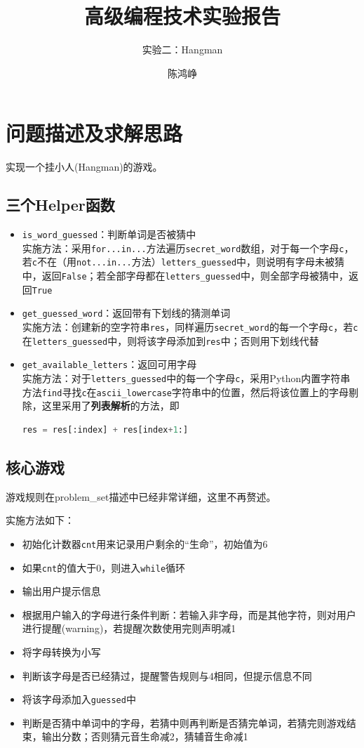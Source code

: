 \documentclass[logo,reportComp]{thesis}
\title{高级编程技术实验报告}
\subtitle{实验二：Hangman}
\author{陈鸿峥}
\begin{document}
\maketitle

\section{问题描述及求解思路}
实现一个挂小人(Hangman)的游戏。

\subsection{三个Helper函数}
\begin{itemize}
	\item \verb'is_word_guessed'：判断单词是否被猜中\\
	实施方法：采用\verb'for...in...'方法遍历\verb'secret_word'数组，对于每一个字母\verb'c'，若\verb'c'不在（用\verb'not...in...'方法）\verb'letters_guessed'中，则说明有字母未被猜中，返回\verb'False'；若全部字母都在\verb'letters_guessed'中，则全部字母被猜中，返回\verb'True'
	\item \verb'get_guessed_word'：返回带有下划线的猜测单词\\
	实施方法：创建新的空字符串\verb'res'，同样遍历\verb'secret_word'的每一个字母\verb'c'，若\verb'c'在\verb'letters_guessed'中，则将该字母添加到\verb'res'中；否则用下划线代替
	\item \verb'get_available_letters'：返回可用字母\\
	实施方法：对于\verb'letters_guessed'中的每一个字母\verb'c'，采用Python内置字符串方法\verb'find'寻找\verb'c'在\verb'ascii_lowercase'字符串中的位置，然后将该位置上的字母剔除，这里采用了\textbf{列表解析}的方法，即
\begin{lstlisting}[language=python]
res = res[:index] + res[index+1:]
\end{lstlisting}
\end{itemize}

\subsection{核心游戏}
游戏规则在problem\_set描述中已经非常详细，这里不再赘述。

实施方法如下：
\begin{itemize}
	\item 初始化计数器\verb'cnt'用来记录用户剩余的``生命''，初始值为6
	\item 如果\verb'cnt'的值大于0，则进入\verb'while'循环
	\item 输出用户提示信息
	\item 根据用户输入的字母进行条件判断：若输入非字母，而是其他字符，则对用户进行提醒(warning)，若提醒次数使用完则声明减1
	\item 将字母转换为小写
	\item 判断该字母是否已经猜过，提醒警告规则与4相同，但提示信息不同
	\item 将该字母添加入\verb'guessed'中
	\item 判断是否猜中单词中的字母，若猜中则再判断是否猜完单词，若猜完则游戏结束，输出分数；否则猜元音生命减2，猜辅音生命减1
\end{itemize}
\end{document}
